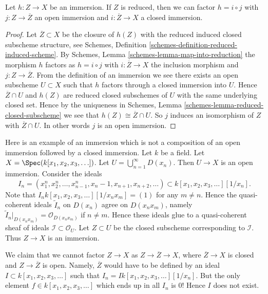 \begin{lemma}
\label{lemma-factor-reduced-immersion}
Let $h : Z \to X$ be an immersion.
If $Z$ is reduced, then we can factor
$h = i \circ j$ with $j : Z \to \overline{Z}$ an
open immersion and $i : \overline{Z} \to X$ a closed immersion.
\end{lemma}

\begin{proof}
Let $\overline{Z} \subset X$ be the closure of $h(Z)$ with the reduced
induced closed subscheme structure, see
Schemes, Definition \ref{schemes-definition-reduced-induced-scheme}.
By Schemes, Lemma \ref{schemes-lemma-map-into-reduction}
the morphism $h$ factors as
$h = i \circ j$ with $i : \overline{Z} \to X$ the inclusion morphism
and $j : Z \to \overline{Z}$. From the definition of an immersion we
see there exists an open subscheme $U \subset X$ such that
$h$ factors through a closed immersion into $U$. Hence
$\overline{Z} \cap U$ and $h(Z)$ are reduced closed subschemes
of $U$ with the same underlying closed set. Hence by the uniqueness
in Schemes, Lemma \ref{schemes-lemma-reduced-closed-subscheme}
we see that $h(Z) \cong \overline{Z} \cap U$.
So $j$ induces an isomorphism of $Z$ with $\overline{Z} \cap U$.
In other words $j$ is an open immersion.
\end{proof}



\begin{example}
\label{example-thibaut}
Here is an example of an immersion which is not a composition of an
open immersion followed by a closed immersion.
Let $k$ be a field.
Let $X = \Spec(k[x_1, x_2, x_3, \ldots])$.
Let $U = \bigcup_{n = 1}^{\infty} D(x_n)$.
Then $U \to X$ is an open immersion.
Consider the ideals
$$
I_n =
(x_1^n, x_2^n, \ldots, x_{n - 1}^n, x_n - 1, x_{n + 1}, x_{n + 2}, \ldots)
\subset
k[x_1, x_2, x_3, \ldots][1/x_n].
$$
Note that $I_n k[x_1, x_2, x_3, \ldots][1/x_nx_m] = (1)$
for any $m \not = n$. Hence the quasi-coherent ideals
$\widetilde I_n$ on $D(x_n)$ agree on $D(x_nx_m)$, namely
$\widetilde I_n|_{D(x_nx_m)} = \mathcal{O}_{D(x_n x_m)}$ if
$n \not = m$. Hence these ideals glue to a quasi-coherent sheaf of ideals
$\mathcal{I} \subset \mathcal{O}_U$.
Let $Z \subset U$ be the closed subscheme corresponding to
$\mathcal{I}$. Thus $Z \to X$ is an immersion.

\medskip\noindent
We claim that we cannot factor $Z \to X$ as
$Z \to \overline{Z} \to X$, where $\overline{Z} \to X$ is closed
and $Z \to \overline{Z}$ is open. Namely, $\overline{Z}$ would
have to be defined by an ideal $I \subset k[x_1, x_2, x_3, \ldots]$
such that $I_n = I k[x_1, x_2, x_3, \ldots][1/x_n]$.
But the only element $f \in k[x_1, x_2, x_3, \ldots]$
which ends up in all $I_n$ is $0$! Hence $I$ does not exist.
\end{example}








